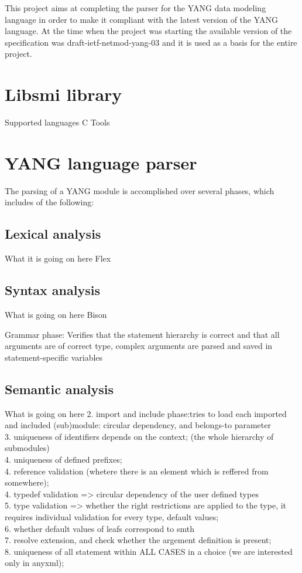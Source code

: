 \documentclass[conference]{IEEEtran}
\begin{document}
This project aims at completing the parser for the YANG data modeling language in order to make it compliant with the latest version of the YANG language. At the time when the project was starting the available version of the specification was draft-ietf-netmod-yang-03 \cite{bib3} and it is used as a basis for the entire project.

\section{Libsmi library}
Supported languages
C
Tools

\section{YANG language parser}
The parsing of a YANG module is accomplished over several phases, which includes of the following:
\subsection{Lexical analysis}
What it is going on here
Flex

\subsection{Syntax analysis}
What is going on here
Bison

Grammar phase:
Verifies that the statement hierarchy is correct and that all arguments are of correct type, complex arguments are parsed and saved in statement-specific variables
 
\subsection{Semantic analysis}
What is going on here
2. import and include phase:tries to load each imported and included (sub)module: circular dependency, and belongs-to parameter\\
3. uniqueness of identifiers depends on  the context; (the whole hierarchy of submodules) \\
4. uniqueness of defined prefixes; \\
4. reference validation (whetere there is an element which is reffered from somewhere);\\
4. typedef validation => circular dependency of the user defined types\\
5. type validation => whether the right restrictions are applied to the type, it requires individual validation for every type, default values;\\
6. whether default values of leafs correspond to smth\\
7. resolve extension, and check whether the argement definition is present;\\
8. uniqueness of all statement within ALL CASES in a choice (we are interested only in anyxml);\\
\end{document}
